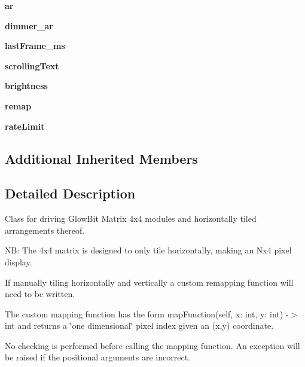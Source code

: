 \begin{DoxyCompactItemize}
{\bfseries ar}
\item 
\mbox{\label{classglowbit_1_1matrix4x4_a1adfc56eb47b5bfc5d3102efaeb38097}} 
{\bfseries dimmer\+\_\+ar}
\item 
\mbox{\label{classglowbit_1_1matrix4x4_afc755575c2642804d5c6eac170723064}} 
{\bfseries last\+Frame\+\_\+ms}
\item 
\mbox{\label{classglowbit_1_1matrix4x4_a60001cda5a86c8d035838f528e3428dc}} 
{\bfseries scrolling\+Text}
\item 
\mbox{\label{classglowbit_1_1matrix4x4_aaa175c98bbdcb35a83dd59192ee0686f}} 
{\bfseries brightness}
\item 
\mbox{\label{classglowbit_1_1matrix4x4_a8d2971111428adb5e6ed35b6f07b63de}} 
{\bfseries remap}
\item 
\mbox{\label{classglowbit_1_1matrix4x4_acfc0f73dcf2d58bb48aec88b6fc0eb33}} 
{\bfseries rate\+Limit}
\end{DoxyCompactItemize}
\subsection*{Additional Inherited Members}


\subsection{Detailed Description}
Class for driving Glow\+Bit Matrix 4x4 modules and horizontally tiled arrangements thereof. 

NB\+: The 4x4 matrix is designed to only tile horizontally, making an Nx4 pixel display.

If manually tiling horizontally and vertically a custom remapping function will need to be written.

The custom mapping function has the form map\+Function(self, x\+: int, y\+: int) -\/$>$ int and returns a \char`\"{}one dimensional\char`\"{} pixel index given an (x,y) coordinate.

No checking is performed before calling the mapping function. An exception will be raised if the positional arguments are incorrect. 


